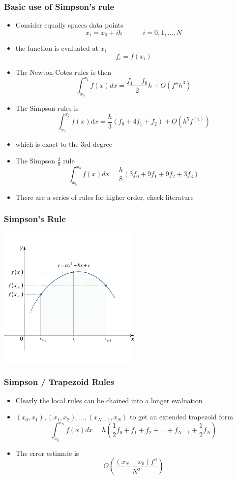 \documentclass[10pt]{beamer}
\begin{document}
\begin{frame}
  \frametitle{Basic use of Simpson's rule}
  \begin{itemize}
  \item Consider equally spaces data points
    \[
      x_i = x_0 + i h \mbox{ ~~~~~~~~} i = 0, 1, ..., N
    \]
    
  \item the function is evaluated at $x_i$
    \[
      f_i = f(x_i)
    \]
  \item The Newton-Cotes rules is then
    \[
      \int_{x_0}^{x_1} f(x) dx = \frac{f_1-f_0}{2} h + O(f'' h^3)
    \]
  \item The Simpson rules is
    \[
      \int_{x_0}^{x_2} f(x) dx = \frac{h}{3} (f_0 + 4 f_1 + f_2) + O(h^5 f^{(4)})
    \]
  \item which is exact to the 3rd degree
  \item The Simpson $\frac{3}{8}$ rule
    \[
      \int_{x_0}^{x_3} f(x) dx = \frac{h}{8} (3 f_0 + 9 f_1 + 9 f_2 + 3 f_3)
    \]
  \item There are a series of rules for higher order, check literature
  \end{itemize}
\end{frame}


\begin{frame}
  \frametitle{Simpson's Rule}
  \centerline{\includegraphics[height=7cm]{simpsons-rule}}
\end{frame}

\begin{frame}
  \frametitle{Simpson / Trapezoid Rules}
  \begin{itemize}
  \item Clearly the local rules can be chained into a longer evaluation
  \item $(x_0, x_1), (x_1, x_2), \ldots, (x_{N-1},x_N)$ to get an extended
    trapezoid form
    \[
      \int_{x_0}^{x_N} f(x) dx = h(\frac{1}{2} f_0 + f_1 + f_2 + \ldots + f_{N-1} + \frac{1}{2} f_N )
    \]
  \item The error estimate is
    \[
      O\left( \frac{(x_N - x_0) f''}{N^2} \right)
    \]
  \end{itemize}
\end{frame}
\end{document}
